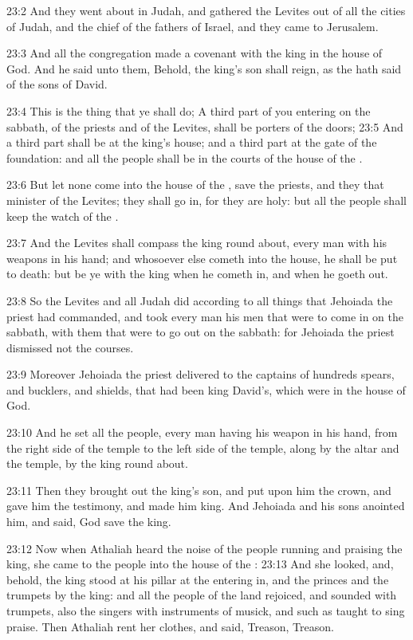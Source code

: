 23:2 And they went about in Judah, and gathered the Levites out of all the cities of Judah, and the chief of the fathers of Israel, and they came to Jerusalem.

23:3 And all the congregation made a covenant with the king in the house of God. And he said unto them, Behold, the king's son shall reign, as the \LORD hath said of the sons of David.

23:4 This is the thing that ye shall do; A third part of you entering on the sabbath, of the priests and of the Levites, shall be porters of the doors; 23:5 And a third part shall be at the king's house; and a third part at the gate of the foundation: and all the people shall be in the courts of the house of the \LORD.

23:6 But let none come into the house of the \LORD, save the priests, and they that minister of the Levites; they shall go in, for they are holy: but all the people shall keep the watch of the \LORD.

23:7 And the Levites shall compass the king round about, every man with his weapons in his hand; and whosoever else cometh into the house, he shall be put to death: but be ye with the king when he cometh in, and when he goeth out.

23:8 So the Levites and all Judah did according to all things that Jehoiada the priest had commanded, and took every man his men that were to come in on the sabbath, with them that were to go out on the sabbath: for Jehoiada the priest dismissed not the courses.

23:9 Moreover Jehoiada the priest delivered to the captains of hundreds spears, and bucklers, and shields, that had been king David's, which were in the house of God.

23:10 And he set all the people, every man having his weapon in his hand, from the right side of the temple to the left side of the temple, along by the altar and the temple, by the king round about.

23:11 Then they brought out the king's son, and put upon him the crown, and gave him the testimony, and made him king. And Jehoiada and his sons anointed him, and said, God save the king.

23:12 Now when Athaliah heard the noise of the people running and praising the king, she came to the people into the house of the \LORD: 23:13 And she looked, and, behold, the king stood at his pillar at the entering in, and the princes and the trumpets by the king: and all the people of the land rejoiced, and sounded with trumpets, also the singers with instruments of musick, and such as taught to sing praise.  Then Athaliah rent her clothes, and said, Treason, Treason.

